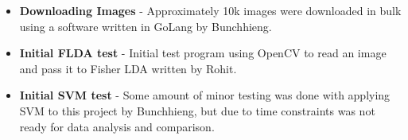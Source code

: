 \documentclass[12pt, conference]{IEEEtran}
\begin{document}
\begin{itemize}
	\item \textbf{Downloading Images} - Approximately 10k images were downloaded in bulk using a software written in GoLang by Bunchhieng.
	\item \textbf{Initial FLDA test} - Initial test program using OpenCV to read an image and pass it to Fisher LDA written by Rohit.
	\item \textbf{Initial SVM test} - Some amount of minor testing was done with applying SVM to this project by Bunchhieng, but due to time constraints was not ready for data analysis and comparison. 
\end{itemize}


\cleardoublepage
\centering
\center


\end{document}
